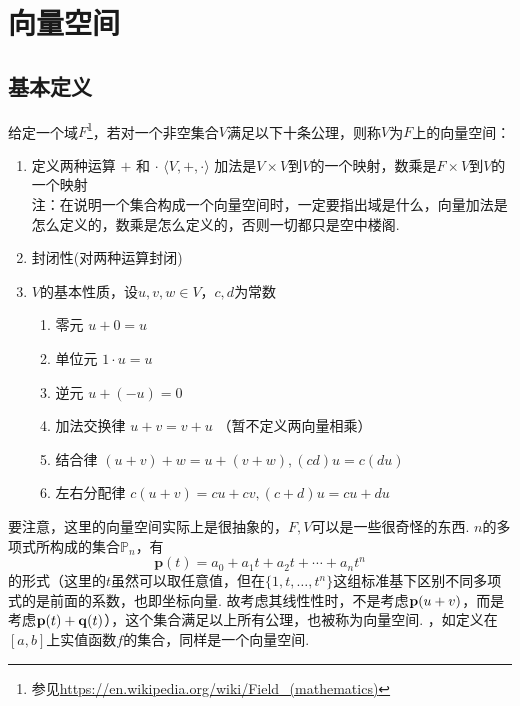 
\section{向量空间}
\subsection{基本定义}
\begin{definition}
给定一个域$F$\footnote{参见\url{https://en.wikipedia.org/wiki/Field_(mathematics)}}，若对一个非空集合$V$满足以下十条公理，则称$V$为$F$上的向量空间：
\begin{enumerate}
	\itemsep -3pt
	\item 定义两种运算 $+$ 和 $\cdot$
		$ \langle V , +, \cdot \rangle$
		加法是$V\times V$到$V$的一个映射，数乘是$F\times V$到$V$的一个映射\\
		注：在说明一个集合构成一个向量空间时，一定要指出域是什么，向量加法是怎么定义的，数乘是怎么定义的，否则一切都只是空中楼阁.
	\item 封闭性(对两种运算封闭)
	\item $V$的基本性质，设$u,v,w\in V$，$c,d$为常数
		\begin{enumerate}
			\itemsep -3pt
			\item 零元 $u+0=u$
			\item 单位元 $1\cdot u=u$
			\item 逆元 $u+(-u)=0$
			\item 加法交换律 $u+v=v+u$ （暂不定义两向量相乘）
			\item 结合律 $(u+v)+w=u+(v+w),(cd)u=c(du)$
			\item 左右分配律 $c(u+v)=cu+cv,(c+d)u=cu+du$
		\end{enumerate}
\end{enumerate}
\end{definition}
要注意，这里的向量空间实际上是很抽象的，$F,V$可以是一些很奇怪的东西.
$n$的多项式所构成的集合$\mathbb{P}_n$，有
\[\mathbf{p}(t)=a_0+a_1t+a_2t+\cdots+a_nt^n\]
的形式（这里的$t$虽然可以取任意值，但在$\{1,t,\dots,t^n\}$这组标准基下区别不同多项式的是前面的系数，也即坐标向量. 故考虑其线性性时，不是考虑$\mathbf{p}(u+v)$，而是考虑$\mathbf{p}(t)+\mathbf{q}(t)$），这个集合满足以上所有公理，也被称为向量空间.
，如定义在$[a,b]$上实值函数$f$的集合，同样是一个向量空间.


